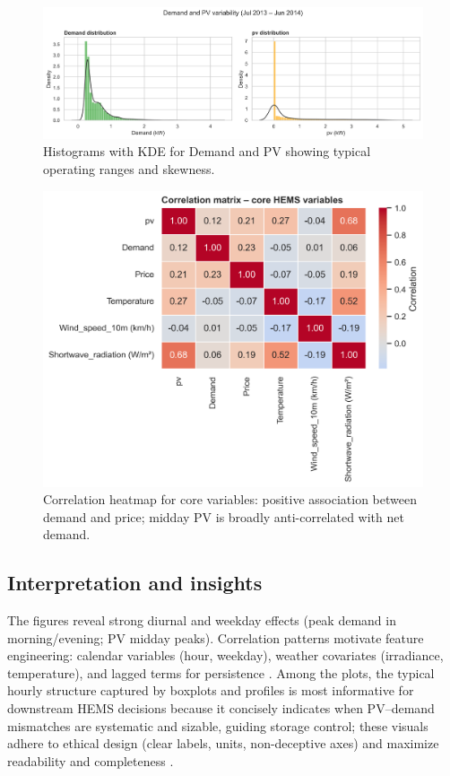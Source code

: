 \documentclass[12pt,a4paper]{article}
\begin{document}
\begin{figure}[H]
  \centering
  \includegraphics[width=0.95\linewidth]{task3_fig2_distributions.png}
  \caption{Histograms with KDE for Demand and PV showing typical operating ranges and skewness.}
  \label{fig:task3_histograms}
\end{figure}

\begin{figure}[H]
  \centering
  \includegraphics[width=0.8\linewidth]{task3_fig4_correlation_heatmap.png}
  \caption{Correlation heatmap for core variables: positive association between demand and price; midday PV is broadly anti-correlated with net demand.}
  \label{fig:task3_corr}
\end{figure}

\subsection{Interpretation and insights}
The figures reveal strong diurnal and weekday effects (peak demand in morning/evening; PV midday peaks). Correlation patterns motivate feature engineering: calendar variables (hour, weekday), weather covariates (irradiance, temperature), and lagged terms for persistence \cite{Hyndman2021}. Among the plots, the typical hourly structure captured by boxplots and profiles is most informative for downstream HEMS decisions because it concisely indicates when PV–demand mismatches are systematic and sizable, guiding storage control; these visuals adhere to ethical design (clear labels, units, non-deceptive axes) and maximize readability and completeness \cite{Antonanzas2016}.
\end{document}
